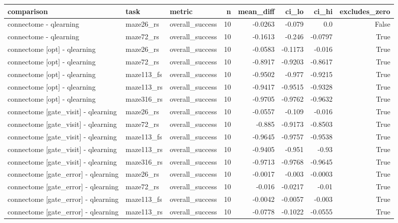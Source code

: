 \begin{table}[t]
\centering
\small
\begin{tabular}{lllrrrrr}
\toprule
comparison & task & metric & n & mean\_diff & ci\_lo & ci\_hi & excludes\_zero \\
\midrule
connectome - qlearning & maze26\_rs & overall\_success & 10 & -0.0263 & -0.079 & 0.0 & False \\
connectome - qlearning & maze72\_rs & overall\_success & 10 & -0.1613 & -0.246 & -0.0797 & True \\
connectome [opt] - qlearning & maze26\_rs & overall\_success & 10 & -0.0583 & -0.1173 & -0.016 & True \\
connectome [opt] - qlearning & maze72\_rs & overall\_success & 10 & -0.8917 & -0.9203 & -0.8617 & True \\
connectome [opt] - qlearning & maze113\_fs & overall\_success & 10 & -0.9502 & -0.977 & -0.9215 & True \\
connectome [opt] - qlearning & maze113\_rs & overall\_success & 10 & -0.9417 & -0.9515 & -0.9328 & True \\
connectome [opt] - qlearning & maze316\_rs & overall\_success & 10 & -0.9705 & -0.9762 & -0.9632 & True \\
connectome [gate\_visit] - qlearning & maze26\_rs & overall\_success & 10 & -0.0557 & -0.109 & -0.016 & True \\
connectome [gate\_visit] - qlearning & maze72\_rs & overall\_success & 10 & -0.885 & -0.9173 & -0.8503 & True \\
connectome [gate\_visit] - qlearning & maze113\_fs & overall\_success & 10 & -0.9645 & -0.9757 & -0.9538 & True \\
connectome [gate\_visit] - qlearning & maze113\_rs & overall\_success & 10 & -0.9405 & -0.951 & -0.93 & True \\
connectome [gate\_visit] - qlearning & maze316\_rs & overall\_success & 10 & -0.9713 & -0.9768 & -0.9645 & True \\
connectome [gate\_error] - qlearning & maze26\_rs & overall\_success & 10 & -0.0017 & -0.003 & -0.0003 & True \\
connectome [gate\_error] - qlearning & maze72\_rs & overall\_success & 10 & -0.016 & -0.0217 & -0.01 & True \\
connectome [gate\_error] - qlearning & maze113\_fs & overall\_success & 10 & -0.0042 & -0.0057 & -0.003 & True \\
connectome [gate\_error] - qlearning & maze113\_rs & overall\_success & 10 & -0.0778 & -0.1022 & -0.0555 & True \\

\end{tabular}
\end{table}
